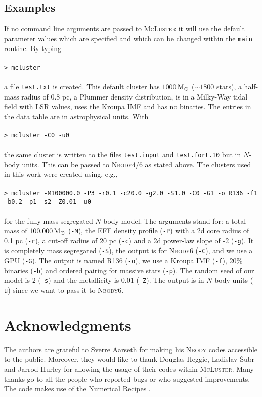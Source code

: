 \documentclass[useAMS,usenatbib]{mn2e}
\newcommand{\msun}{\mbox{$\,{\rm M}_\odot$}}
\begin{document}
\subsection*{Examples}
If no command line arguments are passed to \textsc{McLuster} it will use the default parameter values which are specified and which can be changed within the \texttt{main} routine. By typing\\\\
\texttt{> mcluster}\\\\
a file \texttt{test.txt} is created. This default cluster has $1000\msun$ ($\sim 1800$ stars), a half-mass radius of 0.8 pc, a Plummer density distribution, is in a Milky-Way tidal field with LSR values, uses the Kroupa IMF and has no binaries. The entries in the data table are in astrophysical units. With\\\\
\texttt{> mcluster -C0 -u0}\\\\
the same cluster is written to the files \texttt{test.input} and \texttt{test.fort.10} but in $N$-body units. This can be passed to \textsc{Nbody4/6} as stated above. The clusters used in this work were created using, e.g.,\\\\
\texttt{> mcluster -M100000.0 -P3 -r0.1 -c20.0 -g2.0 -S1.0 -C0 -G1 -o R136 -f1 -b0.2 -p1 -s2 -Z0.01 -u0}\\\\
for the fully mass segregated $N$-body model. The arguments stand for: a total mass of $100.000\msun$ (\texttt{-M}), the EFF density profile (\texttt{-P}) with a 2d core radius of 0.1 pc (\texttt{-r}), a cut-off radius of 20 pc (\texttt{-c}) and a 2d power-law slope of -2 (\texttt{-g}). It is completely mass segregated (\texttt{-S}), the output is for \textsc{Nbody6} (\texttt{-C}), and we use a GPU (\texttt{-G}). The output is named R136 (\texttt{-o}), we use a Kroupa IMF (\texttt{-f}), 20\% binaries (\texttt{-b}) and ordered pairing for massive stars (\texttt{-p}). The random seed of our model is 2 (\texttt{-s}) and the metallicity is 0.01 (\texttt{-Z}). The output is in $N$-body units (\texttt{-u}) since we want to pass it to \textsc{Nbody6}.

\section*{Acknowledgments}
The authors are grateful to Sverre Aarseth for making his \textsc{Nbody} codes accessible to the public. Moreover, they would like to thank Douglas Heggie, Ladislav {\v S}ubr and Jarrod Hurley for allowing the usage of their codes within \textsc{McLuster}. Many thanks go to all the people who reported bugs or who suggested improvements. The code makes use of the Numerical Recipes \citep{Press86}.
\end{document}
